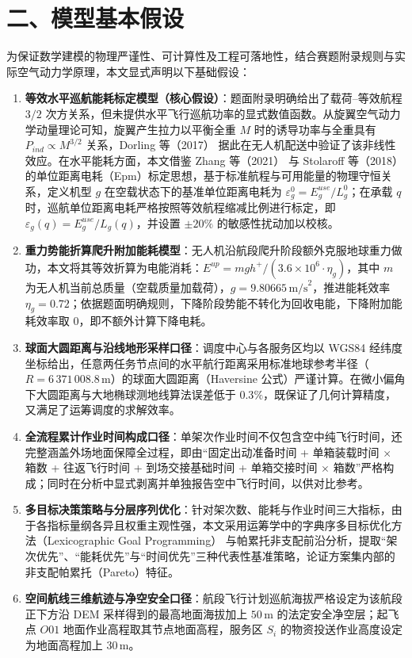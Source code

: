 \documentclass[withoutpreface,bwprint]{format}
\begin{document}
\section{二、模型基本假设}

为保证数学建模的物理严谨性、可计算性及工程可落地性，结合赛题附录规则与实际空气动力学原理，本文显式声明以下基础假设：

\begin{enumerate}[label=\textbf{假设 \arabic*：}, leftmargin=*]
    \item \textbf{等效水平巡航能耗标定模型（核心假设）}：题面附录明确给出了载荷--等效航程 $3/2$ 次方关系，但未提供水平飞行巡航功率的显式数值函数。从旋翼空气动力学动量理论可知，旋翼产生拉力以平衡全重 $M$ 时的诱导功率与全重具有 $P_{ind} \propto M^{3/2}$ 关系\cite{leishman2006}，Dorling 等（2017）\cite{dorling2017} 据此在无人机配送中验证了该非线性效应。在水平能耗方面，本文借鉴 Zhang 等（2021）\cite{zhang2021} 与 Stolaroff 等（2018）\cite{stolaroff2018} 的单位距离电耗（Epm）标定思想，基于标准航程与可用能量的物理守恒关系，定义机型 $g$ 在空载状态下的基准单位距离电耗为 $\varepsilon_g^0 = E_g^{use} / L_g^0$；在承载 $q$ 时，巡航单位距离电耗严格按照等效航程缩减比例进行标定，即 $\varepsilon_g(q) = E_g^{use} / L_g(q)$，并设置 $\pm 20\%$ 的敏感性扰动加以校核。
    \item \textbf{重力势能折算爬升附加能耗模型}：无人机沿航段爬升阶段额外克服地球重力做功，本文将其等效折算为电能消耗：$E^{up} = m g h^+ / (3.6 \times 10^6 \cdot \eta_g)$，其中 $m$ 为无人机当前总质量（空载质量加载荷），$g = 9.80665\,\text{m/s}^2$，推进能耗效率 $\eta_g = 0.72$；依据题面明确规则，下降阶段势能不转化为回收电能，下降附加能耗效率取 0，即不额外计算下降电耗。
    \item \textbf{球面大圆距离与沿线地形采样口径}：调度中心与各服务区均以 WGS84 经纬度坐标给出，任意两任务节点间的水平航行距离采用标准地球参考半径（$R = 6\,371\,008.8\,\text{m}$）的球面大圆距离（Haversine 公式）严谨计算\cite{sinnott1984}。在微小偏角下大圆距离与大地椭球测地线算法\cite{vincenty1975}误差低于 $0.3\%$，既保证了几何计算精度，又满足了运筹调度的求解效率。
    \item \textbf{全流程累计作业时间构成口径}：单架次作业时间不仅包含空中纯飞行时间，还完整涵盖外场地面保障全过程\cite{liu2017}，即由“固定出动准备时间 + 单箱装载时间 $\times$ 箱数 + 往返飞行时间 + 到场交接基础时间 + 单箱交接时间 $\times$ 箱数”严格构成；同时在分析中显式剥离并单独报告空中飞行时间，以供对比参考。
    \item \textbf{多目标决策策略与分层序列优化}：针对架次数、能耗与作业时间三大指标，由于各指标量纲各异且权重主观性强，本文采用运筹学中的字典序多目标优化方法（Lexicographic Goal Programming）\cite{ehrgott2005} 与帕累托非支配前沿分析\cite{marler2004}，提取“架次优先”、“能耗优先”与“时间优先”三种代表性基准策略，论证方案集内部的非支配帕累托（Pareto）特征。
    \item \textbf{空间航线三维航迹与净空安全口径}：航段飞行计划巡航海拔严格设定为该航段正下方沿 DEM 采样得到的最高地面海拔加上 $50\,\text{m}$ 的法定安全净空层；起飞点 $O01$ 地面作业高程取其节点地面高程，服务区 $S_i$ 的物资投送作业高度设定为地面高程加上 $30\,\text{m}$。
\end{enumerate}
\end{document}
